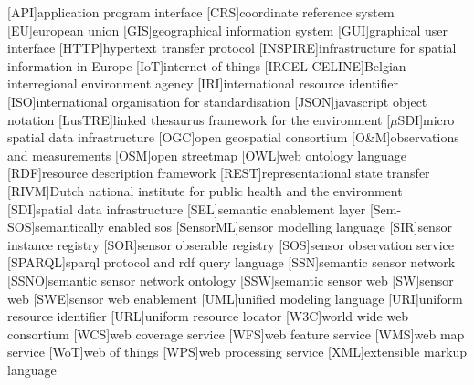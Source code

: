 
\begin{acronym}[UML]
  [API]{application program interface}
  [CRS]{coordinate reference system} 
  [EU]{european union}
  [GIS]{geographical information system}
  [GUI]{graphical user interface}
  [HTTP]{hypertext transfer protocol}
  [INSPIRE]{infrastructure for spatial information in Europe}
  [IoT]{internet of things}
  [IRCEL-CELINE]{Belgian interregional environment agency}
  [IRI]{international resource identifier}
  [ISO]{international organisation for standardisation}
  [JSON]{javascript object notation}
  [LusTRE]{linked thesaurus framework for the environment} 
  [$\mu$SDI]{micro spatial data infrastructure}
  [OGC]{open geospatial consortium}
  [O\&M]{observations and measurements}
  [OSM]{open streetmap}
  [OWL]{web ontology language}
  [RDF]{resource description framework}
  [REST]{representational state transfer}
  [RIVM]{Dutch national institute for public health and the environment}
  [SDI]{spatial data infrastructure}
  [SEL]{semantic enablement layer}
  [Sem-SOS]{semantically enabled sos}
  [SensorML]{sensor modelling language}
  [SIR]{sensor instance registry}
  [SOR]{sensor obserable registry}
  [SOS]{sensor observation service}
  [SPARQL]{sparql protocol and rdf query language}
  [SSN]{semantic sensor network}
  [SSNO]{semantic sensor network ontology}
  [SSW]{semantic sensor web}
  [SW]{sensor web}
  [SWE]{sensor web enablement}
  [UML]{unified modeling language}
  [URI]{uniform resource identifier}
  [URL]{uniform resource locator}
  [W3C]{world wide web consortium}
  [WCS]{web coverage service}
  [WFS]{web feature service}
  [WMS]{web map service}
  [WoT]{web of things}
  [WPS]{web processing service}
  [XML]{extensible markup language}
\end{acronym}